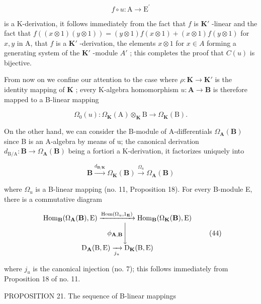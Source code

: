 \[
f \circ u: \mathrm{A} \rightarrow \mathrm{E} ^ {\prime}
\]

is a K-derivation, it follows immediately from the fact that \(f\) is \(\mathbf{K}'\) -linear and the fact that \(f((x \otimes 1)(y \otimes 1)) = (y \otimes 1)f(x \otimes 1) + (x \otimes 1)f(y \otimes 1)\) for \(x, y\) in A, that \(f\) is a \(\mathbf{K}'\) -derivation, the elements \(x \otimes 1\) for \(x \in A\) forming a generating system of the \(\mathbf{K}'\) -module \(A'\) ; this completes the proof that \(C(u)\) is bijective.

From now on we confine our attention to the case where \(\rho: \mathbf{K} \to \mathbf{K}'\) is the identity mapping of \(\mathbf{K}\) ; every K-algebra homomorphism \(u: \mathbf{A} \to \mathbf{B}\) is therefore mapped to a B-linear mapping

\[
\Omega_ {0} (u): \Omega_ {\mathbf {K}} (\mathrm{A}) \otimes_ {\mathbf {K}} \mathrm{B} \rightarrow \Omega_ {\mathbf {K}} (\mathrm{B}).\tag{43}
\]

On the other hand, we can consider the B-module of A-differentials \(\Omega_{\mathbf{A}}(\mathbf{B})\) since B is an A-algebra by means of u; the canonical derivation \(d_{\mathrm{B/A}}: \mathbf{B} \to \Omega_{\mathbf{A}}(\mathbf{B})\) being a fortiori a K-derivation, it factorizes uniquely into

\[
\mathbf {B} \xrightarrow {d _ {\mathbf {B} / \mathbf {K}}} \Omega_ {\mathbf {K}} (\mathbf {B}) \xrightarrow {\Omega_ {u}} \Omega_ {\mathbf {A}} (\mathbf {B})
\]

where \(\Omega_{u}\) is a B-linear mapping (no. 11, Proposition 18). For every B-module E, there is a commutative diagram

\[
\begin{array}{c} \operatorname{Hom} _ {\mathbf {B}} (\Omega_ {\mathbf {A}} (\mathbf {B}), \mathrm{E}) \xrightarrow {\operatorname{Hom} (\Omega_ {u} , 1 _ {\mathbf {E}})} \operatorname{Hom} _ {\mathbf {B}} (\Omega_ {\mathbf {K}} (\mathbf {B}), \mathrm{E}) \\ \phi_ {\mathbf {A}, \mathbf {B}} \Biggl \downarrow \\ \mathrm{D} _ {\mathbf {A}} (\mathrm{B}, \mathrm{E}) \xrightarrow [ j _ {u} ]{} \mathrm{D} _ {\mathbf {K}} (\mathrm{B}, \mathrm{E}) \end{array}\tag{44}
\]

where \(j_{u}\) is the canonical injection (no. 7); this follows immediately from Proposition 18 of no. 11.

PROPOSITION 21. The sequence of B-linear mappings

